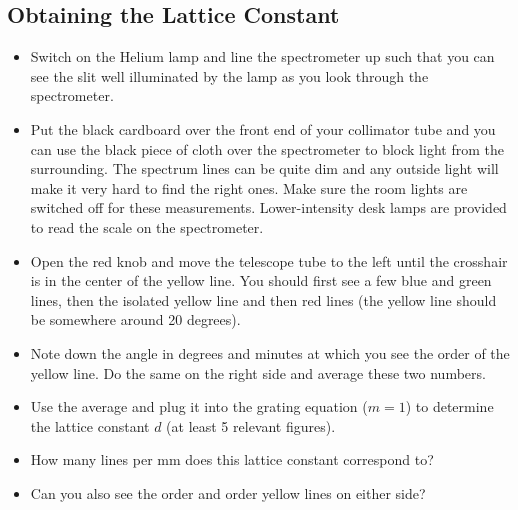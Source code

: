 \subsection{Obtaining the Lattice Constant}
\begin{itemize}
\item Switch on the Helium lamp and line the spectrometer up such that you can see the slit well illuminated by the lamp as you look through the spectrometer.

\item Put the black cardboard over the front end of your collimator tube and you can use the black piece of cloth over the spectrometer to block light from the surrounding. The spectrum lines can be quite dim and any outside light will make it very hard to find the right ones. Make sure the room lights are switched off for these measurements. Lower-intensity desk lamps are provided to read the scale on the spectrometer.

\item Open the red knob and move the telescope tube to the left until the crosshair is in the center of the yellow line. You should first see a few blue and green lines, then the isolated yellow line and then red lines (the yellow line should be somewhere around 20 degrees).

\item Note down the angle in degrees and minutes at which you see the  order of the yellow line. Do the same on the right side and average these two numbers.

\item Use the average and plug it into the grating equation ($m=1$) to determine the lattice constant $d$ (at least 5 relevant figures).

\item How many lines per mm does this lattice constant correspond to?

\item Can you also see the  order and  order yellow lines on either side?
\end{itemize}


